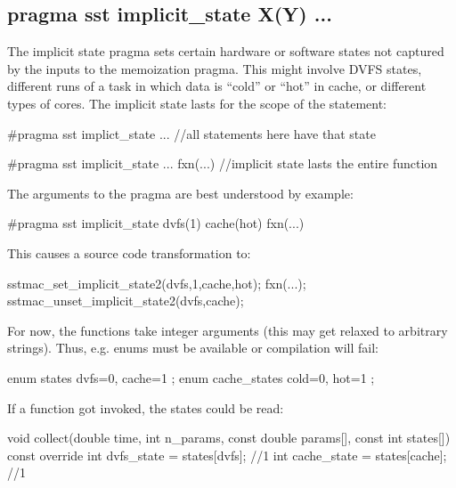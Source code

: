 \subsection{pragma sst implicit\_state X(Y) ...}\label{subsec:implicitStates}
The implicit state pragma sets certain hardware or software states not captured by the inputs to the memoization pragma.
This might involve DVFS states, different runs of a task in which data is ``cold'' or ``hot'' in cache, or different types of cores.
The implicit state lasts for the scope of the statement:

\begin{CppCode}
#pragma sst implict_state ...
{
 //all statements here have that state
}

#pragma sst implicit_state ...
fxn(...) //implicit state lasts the entire function
\end{CppCode}

The arguments to the pragma are best understood by example:

\begin{CppCode}
#pragma sst implicit_state dvfs(1) cache(hot)
fxn(...)
\end{CppCode}
This causes a source code transformation to:

\begin{CppCode}
sstmac_set_implicit_state2(dvfs,1,cache,hot);
fxn(...);
sstmac_unset_implicit_state2(dvfs,cache);
\end{CppCode}
For now, the functions take integer arguments (this may get relaxed to arbitrary strings).
Thus, e.g. enums must be available or compilation will fail:

\begin{CppCode}
enum states {
 dvfs=0,
 cache=1
};
enum cache_states {
 cold=0,
 hot=1
};
\end{CppCode}

If a  function got invoked, the states could be read:

\begin{CppCode}
void collect(double time, int n_params, const double params[], 
			const int states[]) const override {
  int dvfs_state = states[dvfs];  //1
  int cache_state = states[cache]; //1
}
\end{CppCode}
